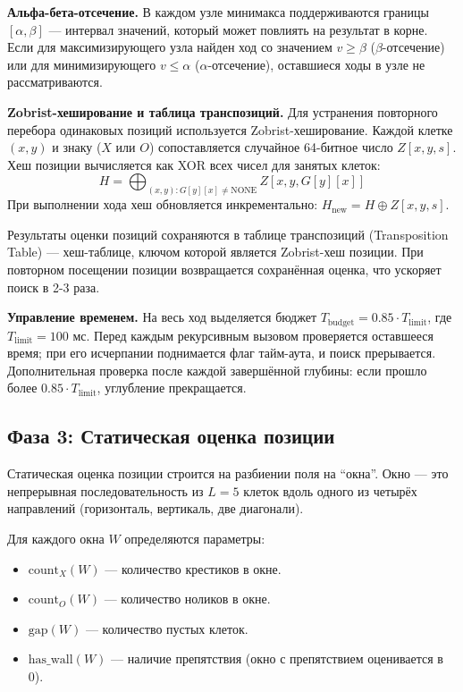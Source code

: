 \documentclass[a4paper,14pt]{extreport}
\begin{document}
\textbf{Альфа-бета-отсечение.} В каждом узле минимакса поддерживаются границы $[\alpha, \beta]$ — интервал значений, который может повлиять на результат в корне. Если для максимизирующего узла найден ход со значением $v \ge \beta$ ($\beta$-отсечение) или для минимизирующего $v \le \alpha$ ($\alpha$-отсечение), оставшиеся ходы в узле не рассматриваются.

\textbf{Zobrist-хеширование и таблица транспозиций.} Для устранения повторного перебора одинаковых позиций используется Zobrist-хеширование. Каждой клетке $(x, y)$ и знаку ($X$ или $O$) сопоставляется случайное 64-битное число $Z[x, y, s]$. Хеш позиции вычисляется как XOR всех чисел для занятых клеток:
\[
H = \bigoplus_{(x,y): G[y][x] \neq \text{NONE}} Z[x, y, G[y][x]]
\]
При выполнении хода хеш обновляется инкрементально: $H_{\text{new}} = H \oplus Z[x, y, s]$.

Результаты оценки позиций сохраняются в таблице транспозиций (Transposition Table) — хеш-таблице, ключом которой является Zobrist-хеш позиции. При повторном посещении позиции возвращается сохранённая оценка, что ускоряет поиск в 2-3 раза.

\textbf{Управление временем.} На весь ход выделяется бюджет $T_{\text{budget}} = 0.85 \cdot T_{\text{limit}}$, где $T_{\text{limit}} = 100$ мс. Перед каждым рекурсивным вызовом проверяется оставшееся время; при его исчерпании поднимается флаг тайм-аута, и поиск прерывается. Дополнительная проверка после каждой завершённой глубины: если прошло более $0.85 \cdot T_{\text{limit}}$, углубление прекращается.

\subsection{Фаза 3: Статическая оценка позиции}
Статическая оценка позиции строится на разбиении поля на ``окна''. Окно — это непрерывная последовательность из $L=5$ клеток вдоль одного из четырёх направлений (горизонталь, вертикаль, две диагонали).

Для каждого окна $W$ определяются параметры:
\begin{itemize}
    \item $\text{count}_X(W)$ — количество крестиков в окне.
    \item $\text{count}_O(W)$ — количество ноликов в окне.
    \item $\text{gap}(W)$ — количество пустых клеток.
    \item $\text{has\_wall}(W)$ — наличие препятствия (окно с препятствием оценивается в 0).
\end{itemize}
\end{document}
